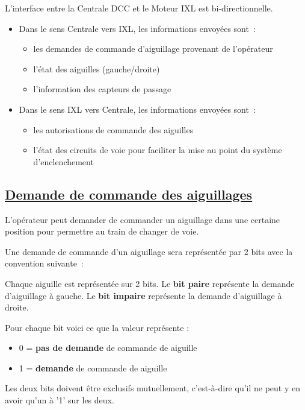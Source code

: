 \newpage

L'interface entre la Centrale DCC et le Moteur IXL est bi-directionnelle. 

\begin{itemize}
\item Dans le sens Centrale vers IXL, les informations envoyées sont~:
  \begin{itemize}
  \item les demandes de commande d'aiguillage provenant de l'opérateur
  \item l'état des aiguilles (gauche/droite)
  \item l'information des capteurs de passage
  \end{itemize}

\item Dans le sens IXL vers Centrale, les informations envoyées sont~:
  \begin{itemize}
  \item les autorisations de commande des aiguilles
  \item l'état des circuits de voie pour faciliter la mise au point 
  du système d'enclenchement
  \end{itemize}
\end{itemize}


\subsection{\underline{Demande de commande des aiguillages}}
\label{sec:ixl_dem_aig}

L'opérateur peut demander de commander un aiguillage dans une certaine
position pour permettre au train de changer de voie.

Une demande de commande d'un aiguillage sera représentée par
2 bits avec la convention suivante~:

Chaque aiguille est représentée sur 2 bits. Le \textbf{bit paire} représente la
demande d'aiguillage à gauche. Le \textbf{bit impaire} représente la demande
d'aiguillage à droite.

\medskip

Pour chaque bit voici ce que la valeur représente :
\begin{itemize}
\item 0 = \textbf{pas de demande} de commande de aiguille
\item 1 = \textbf{demande} de commande de aiguille
\end{itemize}
Les deux bits doivent être exclusifs mutuellement, c'est-à-dire qu'il ne peut y en avoir
qu'un à '1' sur les deux.

